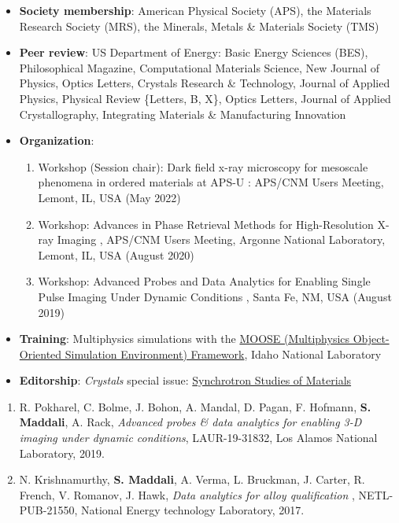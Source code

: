 \documentclass[11pt]{article}
\begin{document}
\begin{itemize}
    \item \textbf{Society membership}: American Physical Society (APS), the Materials Research Society (MRS), the Minerals, Metals \& Materials Society (TMS)
    \item \textbf{Peer review}: US Department of Energy: Basic Energy Sciences (BES), Philosophical Magazine, Computational Materials Science, New Journal of Physics, 
        Optics Letters, Crystals Research \& Technology, Journal of Applied Physics, Physical Review \{Letters, B, X\}, Optics Letters, Journal of Applied Crystallography, 
        Integrating Materials \& Manufacturing Innovation
    \item \textbf{Organization}: 
        \begin{enumerate}
            \item Workshop (Session chair): Dark field x-ray microscopy for mesoscale phenomena in ordered materials at APS-U : APS/CNM Users Meeting, Lemont, IL, USA (May 2022)
            \item Workshop: Advances in Phase Retrieval Methods for High-Resolution X-ray Imaging , APS/CNM Users Meeting, Argonne National Laboratory, Lemont, IL, USA (August 2020)
            \item Workshop: Advanced Probes and Data Analytics for Enabling Single Pulse Imaging Under Dynamic Conditions , Santa Fe, NM, USA (August 2019)
        \end{enumerate}
    \item \textbf{Training}: Multiphysics simulations with the \href{https://mooseframework.inl.gov/}{MOOSE (Multiphysics Object-Oriented Simulation Environment) Framework}, Idaho National Laboratory
    \item \textbf{Editorship}: \emph{Crystals} special issue: \href{https://web.archive.org/web/20210930195051/https://www.mdpi.com/journal/crystals/special_issues/Synchrotron_Studies}{Synchrotron Studies of Materials} 
\end{itemize} 

\begin{enumerate}
    \item R. Pokharel, C. Bolme, J. Bohon, A. Mandal, D. Pagan, F. Hofmann, \textbf{S. Maddali}, A. Rack, \emph{Advanced probes \& data analytics for enabling 3-D imaging under dynamic conditions}, LAUR-19-31832, Los Alamos National Laboratory, 2019. \href{https://web.archive.org/web/20210401223653/https://lanl.gov/science-innovation/science-facilities/dmmsc/_assets/docs/workshops/Advanced-Imaging-Report.pdf}{}
    \item N. Krishnamurthy, \textbf{S. Maddali}, A. Verma, L. Bruckman, J. Carter, R. French, V. Romanov, J. Hawk, \emph{Data analytics for alloy qualification} , NETL-PUB-21550, National Energy technology Laboratory, 2017. \href{https://doi.org/10.2172/1456238}{}
\end{enumerate} 
\end{document}
